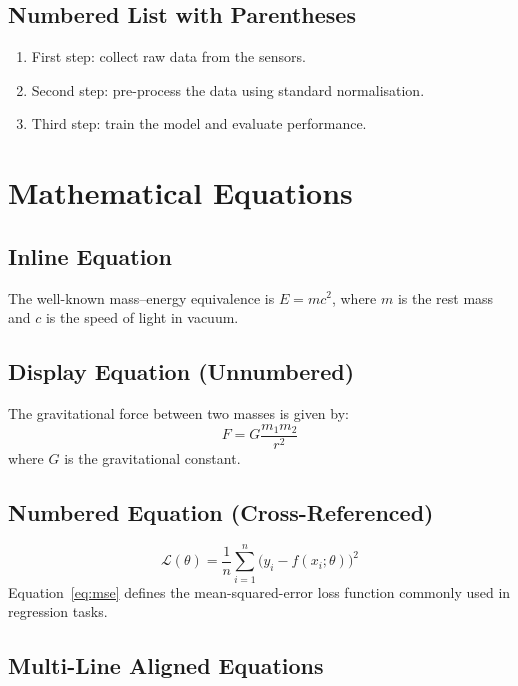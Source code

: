 \subsection{Numbered List with Parentheses}

\begin{enumerate}[label=\arabic*)]
  \item First step: collect raw data from the sensors.
  \item Second step: pre-process the data using standard normalisation.
  \item Third step: train the model and evaluate performance.
\end{enumerate}

\section{Mathematical Equations}
\label{sec:equations}

\subsection{Inline Equation}

The well-known mass--energy equivalence is $E = mc^2$, where $m$ is
the rest mass and $c$ is the speed of light in vacuum.

\subsection{Display Equation (Unnumbered)}

The gravitational force between two masses is given by:
\[
  F = G \frac{m_1 m_2}{r^2}
\]
where $G$ is the gravitational constant.

\subsection{Numbered Equation (Cross-Referenced)}

\begin{equation}
  \mathcal{L}(\theta) = \frac{1}{n} \sum_{i=1}^{n}
    \bigl( y_i - f(x_i; \theta) \bigr)^2
  \label{eq:mse}
\end{equation}
Equation~\ref{eq:mse} defines the mean-squared-error loss function
commonly used in regression tasks.

\subsection{Multi-Line Aligned Equations}

